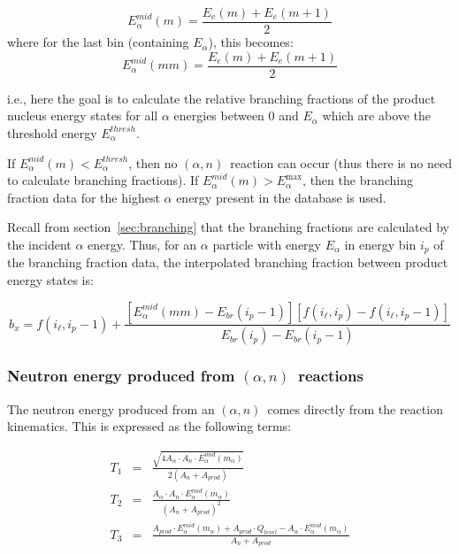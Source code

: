 \documentclass[10pt]{article}
\newcommand{\alphn}[0]{$\left(\alpha,n\right)$}
\begin{document}
\begin{equation}
E_\alpha^{mid}\left(m\right) = \frac{E_e\left(m\right) + E_e\left(m+1\right)}{2}
\end{equation}
where for the last bin (containing $E_\alpha$), this becomes:
\begin{equation}
E_\alpha^{mid}\left(mm\right) = \frac{E_e\left(m\right) + E_e\left(m+1\right)}{2}
\end{equation}

i.e., here the goal is to calculate the relative branching fractions of the product nucleus energy states for all $\alpha$ energies between 0 and $E_\alpha$ which are above the threshold energy $E_\alpha^{thresh}$.

If $E_\alpha^{mid}\left(m\right)<E_\alpha^{thresh}$, then no \alphn\ reaction can occur (thus there is no need to calculate branching fractions). If $E_\alpha^{mid}\left(m\right) > E_\alpha^{\max}$, then the branching fraction data for the highest $\alpha$ energy present in the database is used.

Recall from section~\ref{sec:branching} that the branching fractions are calculated by the incident $\alpha$ energy. Thus, for an $\alpha$ particle with energy $E_\alpha$ in energy bin $i_p$ of the branching fraction data, the interpolated branching fraction between product energy states is:

\begin{equation}
\displaystyle b_x = f\left(i_\ell, i_p-1\right) + \frac{ \left[ E_\alpha^{mid}\left(mm\right) - E_{br} \left( i_p-1 \right) \right] \left[ f\left( i_\ell, i_p\right) - f\left(i_\ell, i_p-1\right) \right] }{ E_{br}\left(i_p \right) - E_{br}\left(i_p-1\right) }
\end{equation}


\subsubsection{Neutron energy produced from \alphn\ reactions}

The neutron energy produced from an \alphn\ comes directly from the reaction kinematics. This is expressed as the following terms:

\begin{eqnarray}
T_1 & = & \frac{\sqrt{4 A_\alpha \cdot A_n \cdot E^{mid}_{\alpha} \left(m_{\alpha} \right)}}{2 \left(A_n + A_{prod} \right) } \\
T_2 & = & \frac{A_\alpha \cdot A_n \cdot E^{mid}_{\alpha}\left(m_{\alpha} \right)}{\left(A_n + A_{prod} \right)^2 } \\
T_3 & = & \frac{ A_{prod} \cdot E^{mid}_{\alpha}\left( m_{\alpha} \right) + A_{prod}   \cdot Q_{level} - A_\alpha \cdot E^{mid}_{\alpha} \left( m_{\alpha} \right) }{A_n + A_{prod}}
\end{eqnarray}
\end{document}
